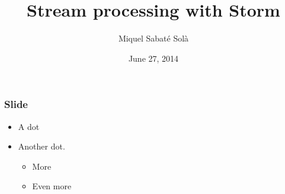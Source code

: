 \documentclass[12pt]{beamer}
\title{Stream processing with Storm}
\author{Miquel Sabaté Solà}
\date{June 27, 2014}
\begin{document}
\frame{\titlepage}


\begin{frame}
\vfill
  \frametitle{Slide}
  \begin{itemize}
    \item A dot
    \vfill
    \item Another dot.
    \vfill
    \begin{itemize}
     \item More
     \vfill
     \item Even more
    \end{itemize}

  \end{itemize}
\vfill
\end{frame}
\end{document}
